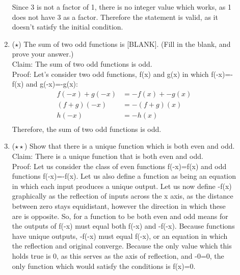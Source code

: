 \documentclass{letter}
\theoremstyle{definition}
\begin{document}
\begin{description}
\begin{enumerate}
Since 3 is not a factor of 1, there is no integer value which works, as 1 does not have 3 as a factor. Therefore the statement is valid, as it doesn't satisfy the initial condition. \\
		\item ($\star$) The sum of two odd functions is [BLANK]. (Fill in the blank, and prove your answer.) \\
Claim: The sum of two odd functions is odd. \\
Proof: Let's consider two odd functions, f(x) and g(x) in which f(-x)=-f(x) and g(-x)=-g(x): \\
\begin{align*}
f(-x) + g(-x) &= -f(x) + -g(x) \tag{addition of two functions} \\
(f+g)(-x) &= -(f+g)(x) \tag{factor our (-x) from left side and (-x) and -1 from right side} \\
h(-x) &= -h(x) \tag{Set f+g=h} \\
\end{align*}
Therefore, the sum of two odd functions is odd. \\

		\item ($\star \star$) Show that there is a unique function which is both even and odd.
Claim: There is a unique function that is both even and odd. \\
Proof: Let us consider the class of even functions f(-x)=f(x) and odd functions f(-x)=-f(x). Let us also define a function as being an equation in which each input produces a unique output. Let us now define -f(x) graphically as the reflection of inputs across the x axis, as the distance between zero stays equidistant, however the direction in which these are is opposite. So, for a function to be both even and odd means for the outputs of f(-x) must equal both f(-x) and -f(-x). Because functions have unique outputs, -f(-x) must equal f(-x), or an equation in which the reflection and original converge. Because the only value which this holds true is 0, as this serves as the axis of reflection, and -0=0, the only function which would satisfy the conditions is f(x)=0.  
\end{enumerate}
\end{description}
\end{document}
